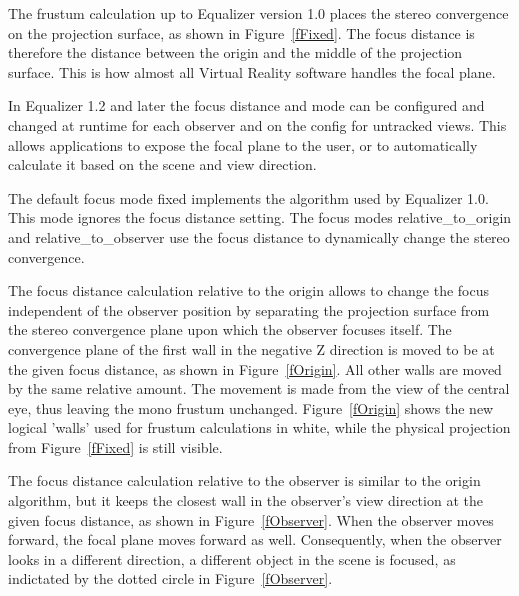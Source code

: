 \documentclass[10pt,a4]{scrartcl}
\newcommand{\fig}[1]{Figure~\ref{#1}}
\begin{document}
The frustum calculation up to Equalizer version 1.0 places the stereo
convergence on the projection surface, as shown in \fig{fFixed}. The focus
distance is therefore the distance between the origin and the middle of the
projection surface. This is how almost all Virtual Reality software handles the
focal plane.

In Equalizer 1.2 and later the focus distance and mode can be configured and
changed at runtime for each \textsf{observer} and on the \textsf{config} for
untracked views. This allows applications to expose the focal plane to the user,
or to automatically calculate it based on the scene and view direction.

The default focus mode \textsf{fixed} implements the algorithm used by Equalizer
1.0. This mode ignores the focus distance setting. The focus modes
\textsf{relative\_to\_origin} and \textsf{relative\_to\_observer} use the focus
distance to dynamically change the stereo convergence.

The focus distance calculation relative to the origin allows to change the
focus independent of the observer position by separating the projection surface
from the stereo convergence plane upon which the observer focuses itself. The
convergence plane of the first wall in the negative Z direction is moved to be
at the given focus distance, as shown in \fig{fOrigin}. All other walls are
moved by the same relative amount. The movement is made from the view of the
central eye, thus leaving the mono frustum unchanged. \fig{fOrigin} shows the
new logical 'walls' used for frustum calculations in white, while the physical
projection from \fig{fFixed} is still visible.

The focus distance calculation relative to the observer is similar to the origin
algorithm, but it keeps the closest wall in the observer's view direction at the
given focus distance, as shown in \fig{fObserver}. When the observer moves
forward, the focal plane moves forward as well. Consequently, when the observer
looks in a different direction, a different object in the scene is focused, as
indictated by the dotted circle in \fig{fObserver}.
\end{document}
